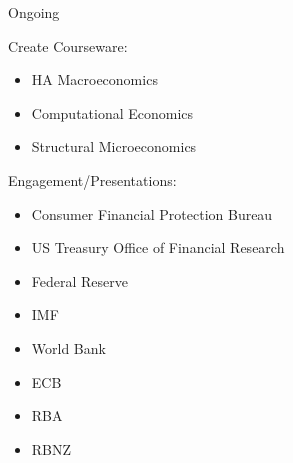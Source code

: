 \begin{frame}{%
\protect\hypertarget{ongoing}{%
Ongoing}}

Create Courseware:

\begin{itemize}
\tightlist
\item
  HA Macroeconomics
\item
  Computational Economics
\item
  Structural Microeconomics
\end{itemize}

\pause

Engagement/Presentations:

\begin{itemize}
\tightlist
\item
  Consumer Financial Protection Bureau
\item
  US Treasury Office of Financial Research
\item
  Federal Reserve
\item
  IMF
\item
  World Bank
\item
  ECB
\item
  RBA
\item
  RBNZ
\end{itemize}

\pause

\end{frame}
